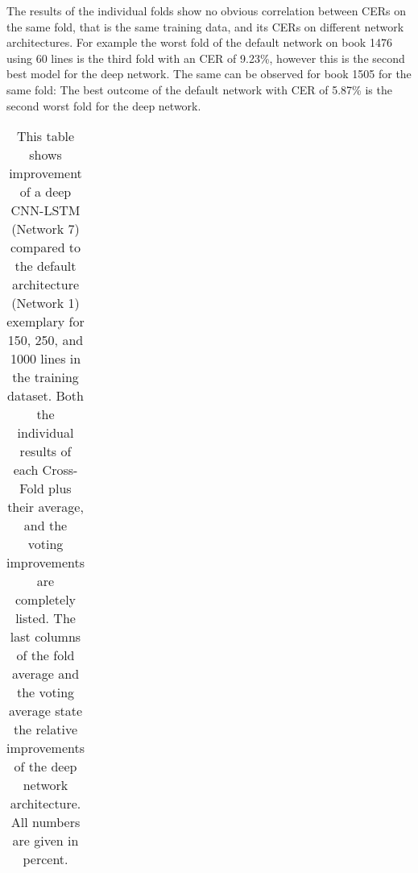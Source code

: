 \documentclass{jlcl}
\begin{document}
The results of the individual folds show no obvious correlation between CERs on the same fold, that is the same training data, and its CERs on different network architectures.
For example the worst fold of the default network on book 1476 using 60 lines is the third fold with an CER of 9.23\%, however this is the second best model for the deep network.
The same can be observed for book 1505 for the same fold: The best outcome of the default network with CER of 5.87\% is the second worst fold for the deep network.

\begin{table}[tp]
    \setlength{\tabcolsep}{0.5em}
    \centering
    \caption{This table shows improvement of a deep CNN-LSTM (Network 7) compared to the default architecture (Network 1) exemplary for 150, 250, and 1000 lines in the training dataset.
    Both the individual results of each Cross-Fold plus their average, and the voting improvements are completely listed.
    The last columns of the fold average and the voting average state the relative improvements of the deep network architecture.
    All numbers are given in percent.}
    \label{tab:results}
    \begin{tabular}{c|l|ccccc|cc|cc}

\end{tabular}
\end{table}
\end{document}
